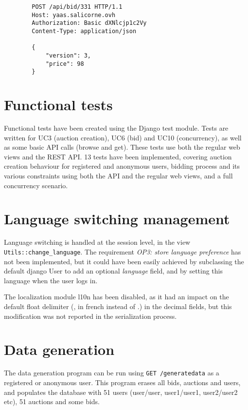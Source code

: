\documentclass[a4paper, 11pt]{report}
\begin{document}
    \begin{lstlisting}
        POST /api/bid/331 HTTP/1.1
        Host: yaas.salicorne.ovh
        Authorization: Basic dXNlcjp1c2Vy
        Content-Type: application/json

        {
            "version": 3, 
            "price": 98
        }
    \end{lstlisting}


    \section{Functional tests}

    Functional tests have been created using the Django test module. Tests are written for UC3 (auction creation), UC6 (bid) and UC10 (concurrency), as well as some basic API calls (browse and get). These tests use both the regular web views and the REST API. 13 tests have been implemented, covering auction creation behaviour for registered and anonymous users, bidding process and its various constraints using both the API and the regular web views, and a full concurrency scenario. 

    \section{Language switching management}

    Language switching is handled at the session level, in the view \texttt{Utils::change\_language}. The requirement \textit{OP3: store language preference} has not been implemented, but it could have been easily achieved by subclassing the default django User to add an optional \textit{language} field, and by setting this language when the user logs in. 

    The localization module l10n has been disabled, as it had an impact on the default float delimiter (, in french instead of .) in the decimal fields, but this modification was not reported in the serialization process. 

    \section{Data generation}

    The data generation program can be run using \texttt{GET /generatedata} as a registered or anonymous user. This program erases all bids, auctions and users, and populates the database with 51 users (user/user, user1/user1, user2/user2 etc), 51 auctions and some bids. 
\end{document}
